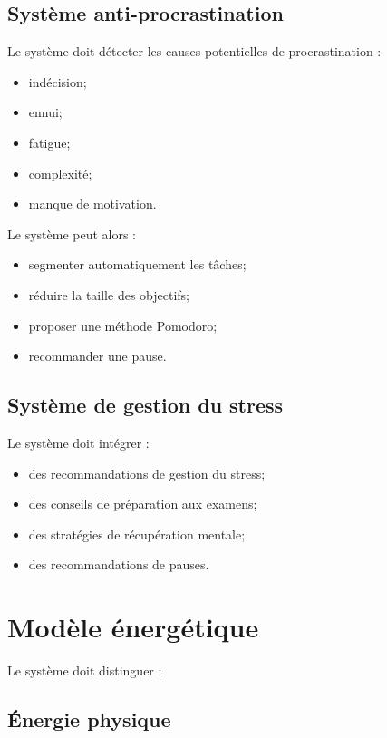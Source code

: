 \documentclass[12pt]{article}
\begin{document}
\subsection{Système anti-procrastination}

Le système doit détecter les causes potentielles de procrastination :
\begin{itemize}
    \item indécision;
    \item ennui;
    \item fatigue;
    \item complexité;
    \item manque de motivation.
\end{itemize}

Le système peut alors :
\begin{itemize}
    \item segmenter automatiquement les tâches;
    \item réduire la taille des objectifs;
    \item proposer une méthode Pomodoro;
    \item recommander une pause.
\end{itemize}

\subsection{Système de gestion du stress}

Le système doit intégrer :
\begin{itemize}
    \item des recommandations de gestion du stress;
    \item des conseils de préparation aux examens;
    \item des stratégies de récupération mentale;
    \item des recommandations de pauses.
\end{itemize}

\section{Modèle énergétique}

Le système doit distinguer :

\subsection{Énergie physique}
\end{document}
